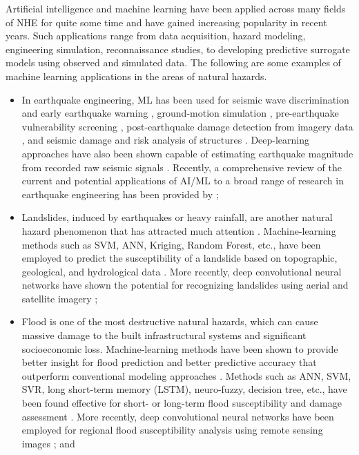 Artificial intelligence and machine learning  have been applied across many fields of NHE for quite some time and have gained increasing popularity in recent years. Such applications range from data acquisition, hazard modeling, engineering simulation, reconnaissance studies, to developing predictive surrogate models using observed and simulated data. The following are some examples of machine learning applications in the areas of natural hazards.

\begin{itemize}
 \item In earthquake engineering, ML has been used for seismic wave discrimination and early earthquake warning \citep{li2018machine}, ground-motion simulation \citep{alimoradi2015machinelearning}, pre-earthquake vulnerability screening \citep{yu2019building}, post-earthquake damage detection from imagery data \citep{cooner2016detection, bai2017machine}, and seismic damage and risk analysis of structures \citep{gidaris2015kriging}. Deep-learning approaches have also been shown capable of estimating earthquake magnitude from recorded raw seismic signals \citep{mousavi2020machine}. Recently, a comprehensive review of the current and potential applications of AI/ML to a broad range of research in earthquake engineering has been provided by \citet{xie2020promise};

 \item Landslides, induced by earthquakes or heavy rainfall, are another natural hazard phenomenon that has attracted much attention \citep{dou2014gisbased}. Machine-learning methods such as SVM, ANN, Kriging, Random Forest, etc., have been employed to predict the susceptibility of a landslide based on topographic, geological, and hydrological data \citep{yao2008landslide, goetz2015evaluating, pham2016comparative}. More recently, deep convolutional neural networks have shown the potential for recognizing landslides using aerial and satellite imagery \citep{ghorbanzadeh2019evaluation};

 \item Flood is one of the most destructive natural hazards, which can cause massive damage to the built infrastructural systems and significant socioeconomic loss. Machine-learning methods have been shown to provide better insight for flood prediction and better predictive accuracy that outperform conventional modeling approaches \citep{abbot2014input, mosavi2018flood}. Methods such as ANN, SVM, SVR, long short-term memory (LSTM), neuro-fuzzy, decision tree, etc., have been found effective for short- or long-term flood susceptibility and damage assessment \citep{kim2016realtime, gizaw2016regional, resch2018combining, darabi2019urban, le2019application}. More recently, deep convolutional neural networks have been employed for regional flood susceptibility analysis using remote sensing images \citep{gebrehiwot2019deep, li2019urban, wang2020flood}; and


\end{itemize}
